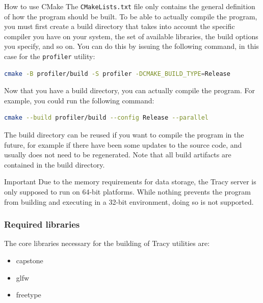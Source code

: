 \documentclass[hidelinks,titlepage,a4paper,twoside]{article}
\begin{document}
\begin{bclogo}[
noborder=true,
couleur=black!5,
logo=\bclampe
]{How to use CMake}
The \texttt{CMakeLists.txt} file only contains the general definition of how the program should be built. To be able to actually compile the program, you must first create a build directory that takes into account the specific compiler you have on your system, the set of available libraries, the build options you specify, and so on. You can do this by issuing the following command, in this case for the \texttt{profiler} utility:

\begin{lstlisting}[language=sh]
cmake -B profiler/build -S profiler -DCMAKE_BUILD_TYPE=Release
\end{lstlisting}

Now that you have a build directory, you can actually compile the program. For example, you could run the following command:

\begin{lstlisting}[language=sh]
cmake --build profiler/build --config Release --parallel
\end{lstlisting}

The build directory can be reused if you want to compile the program in the future, for example if there have been some updates to the source code, and usually does not need to be regenerated. Note that all build artifacts are contained in the build directory.
\end{bclogo}

\begin{bclogo}[
noborder=true,
couleur=black!5,
logo=\bcbombe
]{Important}
Due to the memory requirements for data storage, the Tracy server is only supposed to run on 64-bit platforms. While nothing prevents the program from building and executing in a 32-bit environment, doing so is not supported.
\end{bclogo}

\subsubsection{Required libraries}

The core libraries necessary for the building of Tracy utilities are:

\begin{itemize}
\item capstone
\item glfw
\item freetype
\end{itemize}
\end{document}
